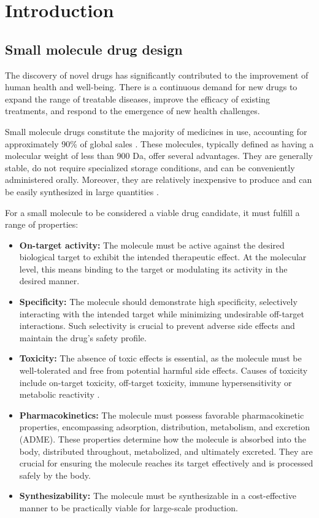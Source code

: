 \chapter{Introduction\label{chap:introduction}}
\section{Small molecule drug design\label{sec:drug-design}}

The discovery of novel drugs has significantly contributed to the improvement of human health and
well-being. There is a continuous demand for new drugs to expand the range of treatable diseases,
improve the efficacy of existing treatments, and respond to the emergence of new health challenges.

Small molecule drugs constitute the majority of medicines in use, accounting for approximately 90\%
of global sales \citep{makurvetBiologicsVsSmall2021}. These molecules, typically defined as having a
molecular weight of less than 900 Da, offer several advantages. They are generally stable, do not
require specialized storage conditions, and can be conveniently administered orally. Moreover, they
are relatively inexpensive to produce and can be easily synthesized in large quantities
\citep{southeyIntroductionSmallMolecule2023}.

For a small molecule to be considered a viable drug candidate, it must fulfill a range of properties:
\begin{itemize}
    \item \textbf{On-target activity:} The molecule must be active against the desired biological target to exhibit
          the intended therapeutic effect. At the molecular level, this means binding to the target or
          modulating its activity in the desired manner.
    \item \textbf{Specificity:} The molecule should demonstrate high specificity, selectively
          interacting with the intended target while minimizing undesirable off-target interactions. Such
          selectivity is crucial to prevent adverse side effects and maintain the drug's safety profile.
    \item \textbf{Toxicity:} The absence of toxic effects is essential, as the molecule must be
          well-tolerated and free from potential harmful side effects. Causes of toxicity include
          on-target toxicity, off-target toxicity, immune hypersensitivity or metabolic reactivity
          \citep{guengerichMechanismsDrugToxicity2011}.
    \item \textbf{Pharmacokinetics:} The molecule must possess favorable pharmacokinetic properties,
          encompassing adsorption, distribution, metabolism, and excretion (ADME). These properties determine
          how the molecule is absorbed into the body, distributed throughout, metabolized, and ultimately
          excreted. They are crucial for ensuring the molecule reaches its target effectively and is processed
          safely by the body.
    \item \textbf{Synthesizability:} The molecule must be synthesizable in a cost-effective manner to be
          practically viable for large-scale production.
\end{itemize}

